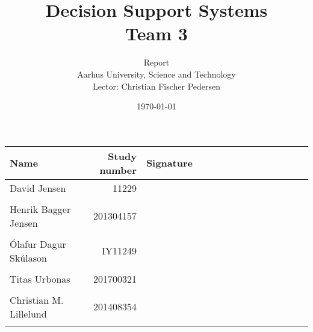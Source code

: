 \documentclass[a4paper,11pt,oneside]{memoir}
\title{Decision Support Systems \\ Team 3}
\author{Report \\ Aarhus University, Science and Technology \\ Lector: Christian Fischer Pedersen}
\date{\today}
\begin{document}
\fancyhf{} %
\frontmatter
\maketitle
\vfill


\begin{table} [h]
	\centering
	\begin{tabular}{|l|r|l|}
	\hline 
	\textbf{Name} 				& \textbf{Study number} & \textbf{Signature~~~~~~~~~~~~~~~~~~~~} 	\\ \hline
	David Jensen 				& 11229 	& \\ && 												\\ \hline
	Henrik Bagger Jensen 		& 201304157 & \\ && 												\\ \hline
	Ólafur Dagur Skúlason 		& IY11249	& \\ && 												\\ \hline
	Titas Urbonas 				& 201700321 & \\ && 												\\ \hline
	Christian M. Lillelund 		& 201408354 & \\ && 												\\ \hline
	\end{tabular}
\end{table}

\clearpage
\pagestyle{plain}

\tableofcontents

\vfill

\mainmatter
\pagestyle{fancy}
\fancyhf{} %
\fancyhead[C]{\nouppercase{\leftmark}}
\fancyfoot[C]{\nouppercase{\rightmark}}
\fancyfoot[R]{\thepage}

								    \clearpage
										\clearpage
					\clearpage
							\clearpage
     							\clearpage
							\clearpage
							\clearpage
						\clearpage
								        \clearpage
										\clearpage
									\clearpage
									\clearpage

\end{document}
